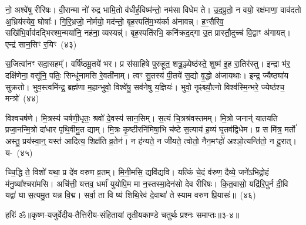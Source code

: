 नो॒ अश्वे॑षु रीरिषः। वी॒रान्मा नो॑ रुद्र भामि॒तो व॑धीर्\mbox{}ह॒विष्म॑न्तो॒ नम॑सा विधेम ते। उ॒द॒प्रुतो॒ न वयो॒ रक्ष॑माणा॒ वाव॑दतो अ॒भ्रिय॑स्येव॒ घोषाः᳚। गि॒रि॒भ्रजो॒ नोर्मयो॒ मद॑न्तो॒ बृह॒स्पति॑म॒भ्य॑र्का अ॑नावन्न्। ह॒ꣳ॒सैरि॑व॒ सखि॑भि॒र्वाव॑दद्भिरश्म॒न्मया॑नि॒ नह॑ना॒ व्यस्यन्न्॑। बृह॒स्पति॑रभि॒ कनि॑क्रद॒द्गा उ॒त प्रास्तौ॒दुच्च॑ वि॒द्वाꣳ अ॑गायत्। एन्द्र॑ सान॒सिꣳ र॒यिꣳ~(४३)\ip

स॒जित्वा॑नꣳ सदा॒सहम्᳚। वर्\mbox{}षि॑ष्ठमू॒तये॑ भर। प्र स॑साहिषे पुरुहूत॒ शत्रू॒ञ्ज्येष्ठ॑स्ते॒ शुष्म॑ इ॒ह रा॒तिर॑स्तु। इन्द्रा भ॑र॒ दक्षि॑णेना॒ वसू॑नि॒ पतिः॒ सिन्धू॑नामसि रे॒वती॑नाम्। त्वꣳ सु॒तस्य॑ पी॒तये॑ स॒द्यो वृ॒द्धो अ॑जायथाः। इन्द्र॒ ज्यैष्ठ्या॑य सुक्रतो। भुव॒स्त्वमि॑न्द्र॒ ब्रह्म॑णा म॒हान्भुवो॒ विश्वे॑षु॒ सव॑नेषु य॒ज्ञियः॑। भुवो॒ नॄꣴश्च्यौ॒त्नो विश्व॑स्मि॒न्भरे॒ ज्येष्ठ॑श्च॒ मन्त्रो॑~(४४)\ip

विश्वचर्\mbox{}षणे। मि॒त्रस्य॑ चर्\mbox{}षणी॒धृतः॒ श्रवो॑ दे॒वस्य॑ सान॒सिम्। स॒त्यं चि॒त्रश्र॑वस्तमम्। मि॒त्रो जनान्॑ यातयति प्रजा॒नन्मि॒त्रो दा॑धार पृथि॒वीमु॒त द्याम्। मि॒त्रः कृ॒ष्टीरनि॑मिषा॒भि च॑ष्टे स॒त्याय॑ ह॒व्यं घृ॒तव॑द्विधेम। प्र स मि॑त्र॒ मर्तो॑ अस्तु॒ प्रय॑स्वा॒न्॒ यस्त॑ आदित्य॒ शिक्ष॑ति व्र॒तेन॑। न ह॑न्यते॒ न जी॑यते॒ त्वोतो॒ नैन॒मꣳहो॑ अश्ञो॒त्यन्ति॑तो॒ न दू॒रात्। य-~(४५)\ip

च्चि॒द्धि ते॒ विशो॑ यथा॒ प्र दे॑व वरुण व्र॒तम्। मि॒नी॒मसि॒ द्यवि॑द्यवि। यत्किं चे॒दं व॑रुण॒ दैव्ये॒ जने॑\-ऽभिद्रो॒हं म॑नु॒ष्या᳚श्चरा॑मसि। अचि॑त्ती॒ यत्तव॒ धर्मा॑ युयोपि॒म मा न॒स्तस्मा॒देन॑सो देव रीरिषः। कि॒त॒वासो॒ यद्रि॑रि॒पुर्न दी॒वि यद्वा॑ घा स॒त्यमु॒त यन्न वि॒द्म। सर्वा॒ ता वि ष्य॑ शिथि॒रेव॑ दे॒वाथा॑ ते स्याम वरुण प्रि॒यासः॑॥~(४६)\ip

{\anuvakamend[{सोमो॒ गोषु॒ मा र॒यिं मन्त्रो॒ यच्छि॑थि॒रा स॒प्त च॑}]}%

{हरिः॑ ॐ}{॥कृष्ण-यजुर्वेदीय-तैत्तिरीय-संहितायां तृतीयकाण्डे चतुर्थः प्रश्नः समाप्तः॥३-४॥}


